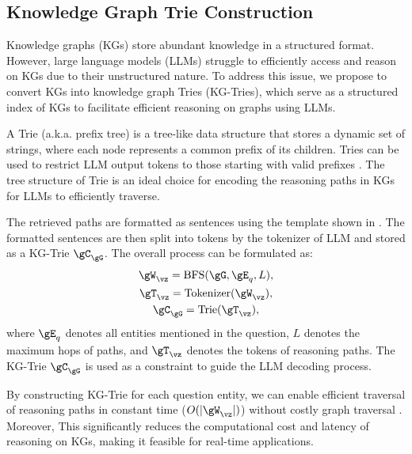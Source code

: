 \subsection{Knowledge Graph Trie Construction}
Knowledge graphs (KGs) store abundant knowledge in a structured format. However, large language models (LLMs) struggle to efficiently access and reason on KGs due to their unstructured nature. To address this issue, we propose to convert KGs into knowledge graph Tries (KG-Tries), which serve as a structured index of KGs to facilitate efficient reasoning on graphs using LLMs. 

A Trie (a.k.a. prefix tree) \citep{wiki:trie,fredkin1960trie} is a tree-like data structure that stores a dynamic set of strings, where each node represents a common prefix of its children. Tries can be used to restrict LLM output tokens to those starting with valid prefixes \citep{deautoregressive,xie2022discrimination,chen2022knowledge}. The tree structure of Trie is an ideal choice for encoding the reasoning paths in KGs for LLMs to efficiently traverse. 

 The retrieved paths are formatted as sentences using the template shown in . The formatted sentences are
then split into tokens by the tokenizer of LLM and stored as a KG-Trie $\gC_{\gG}$. The overall process can be formulated as:
{
\setlength\abovedisplayskip{2pt}  
\setlength\belowdisplayskip{2pt} 
\begin{gather}
    \gW_{\vz} = \text{BFS}(\gG, \gE_q, L),\\
    \gT_\vz = \text{Tokenizer}(\gW_{\vz}), \\
    \gC_{\gG} = \text{Trie}(\gT_\vz),
\end{gather}
where $\gE_q$ denotes all entities mentioned in the question, $L$ denotes the maximum hops of paths, and $\gT_\vz$ denotes the tokens of reasoning paths. The KG-Trie $\gC_{\gG}$ is used as a constraint to guide the LLM decoding process.
}

By constructing KG-Trie for each question entity, we can enable efficient traversal of reasoning paths in constant time ($O(|\gW_\vz|)$) without costly graph traversal \citep{sunthink}. Moreover,  This significantly reduces the computational cost and latency of reasoning on KGs, making it feasible for real-time applications.

